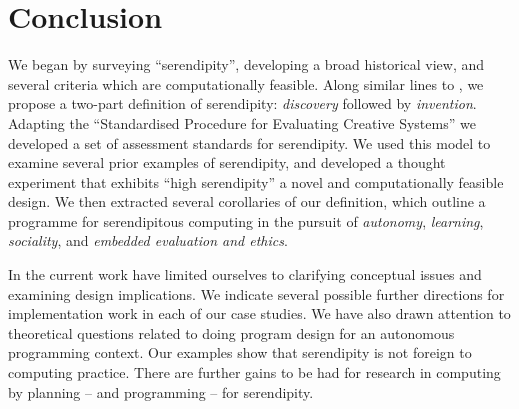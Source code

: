 \section{Conclusion} \label{sec:conclusion}

%
We began by surveying ``serendipity'', developing a broad historical
view, and several criteria which are computationally feasible.  Along
similar lines to , we propose a two-part
definition of serendipity: \emph{discovery} followed by
\emph{invention}.
%
Adapting the ``Standardised Procedure for Evaluating Creative
Systems'' we developed a set of assessment standards for serendipity.
%
We used this model to examine several prior examples of serendipity,
and developed a thought experiment that exhibits ``high serendipity''
a novel and computationally feasible design.
%
We then extracted several corollaries of our definition, which outline
a programme for serendipitous computing in the pursuit of
\emph{autonomy}, \emph{learning}, \emph{sociality}, and \emph{embedded
  evaluation and ethics}.

In the current work have limited ourselves to clarifying conceptual
issues and examining design implications.
% 
We indicate several possible further directions for implementation
work in each of our case studies.  We have also drawn attention to
theoretical questions related to doing program design for an
autonomous programming context.  Our examples show that serendipity is
not foreign to computing practice.  There are further gains to be had
for research in computing by planning -- and programming -- for
serendipity.
%

